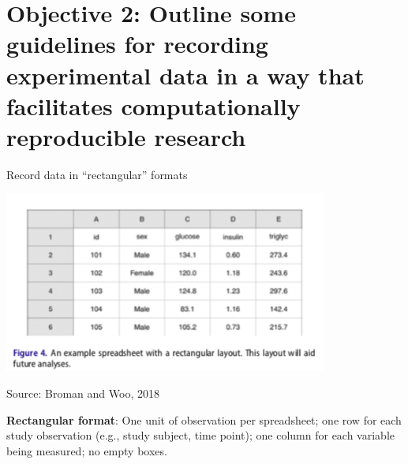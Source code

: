 \documentclass[ignorenonframetext,]{beamer}
\begin{document}
\hypertarget{objective-2-outline-some-guidelines-for-recording-experimental-data-in-a-way-that-facilitates-computationally-reproducible-research}{%
\section{Objective 2: Outline some guidelines for recording experimental
data in a way that facilitates computationally reproducible
research}\label{objective-2-outline-some-guidelines-for-recording-experimental-data-in-a-way-that-facilitates-computationally-reproducible-research}}

\begin{frame}{Record data in ``rectangular'' formats}
\protect\hypertarget{record-data-in-rectangular-formats}{}

\begin{center}\includegraphics[width=0.8\textwidth]{figures/rectangular_data} \end{center}

\vspace{-0.4cm}

\scriptsize Source: Broman and Woo, 2018

\bigskip

\small \textbf{Rectangular format}: One unit of observation per
spreadsheet; one row for each study observation (e.g., study subject,
time point); one column for each variable being measured; no empty
boxes.

\end{frame}
\end{document}
